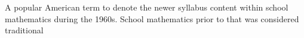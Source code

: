 A popular American term to denote the newer syllabus content 
within school mathematics during the 1960s. School 
mathematics prior to that was considered traditional
